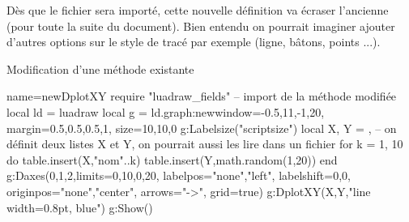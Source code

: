 Dès que le fichier sera importé, cette nouvelle définition va écraser l'ancienne (pour toute la suite du document). Bien entendu on pourrait imaginer ajouter d'autres options sur le style de tracé par exemple (ligne, bâtons, points ...).

\begin{demo}{Modification d'une méthode existante}
\begin{luadraw}{name=newDplotXY}
require "luadraw_fields" -- import de la méthode modifiée
local ld = luadraw
local g = ld.graph:new{window={-0.5,11,-1,20}, margin={0.5,0.5,0.5,1}, size={10,10,0}}
g:Labelsize("scriptsize")
local X, Y = {}, {} -- on définit deux listes X et Y, on pourrait aussi les lire dans un fichier
for k = 1, 10 do
    table.insert(X,"nom"..k)
    table.insert(Y,math.random(1,20))
end
g:Daxes({0,1,2},{limits={{0,10},{0,20}}, labelpos={"none","left"},
    labelshift={0,0}, originpos={"none","center"}, arrows="->", grid=true})
g:DplotXY(X,Y,"line width=0.8pt, blue")
g:Show()
\end{luadraw}
\end{demo}
